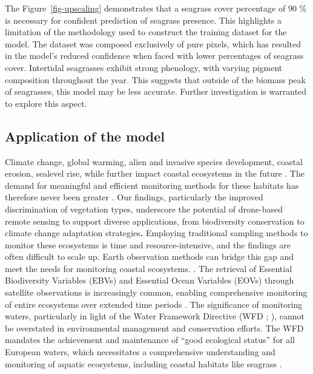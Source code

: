 \documentclass[
  number]{elsarticle}
\begin{document}
The Figure~\ref{fig-upscaling} demonstrates that a seagrass cover
percentage of 90 \% is necessary for confident prediction of seagrass
presence. This highlights a limitation of the methodology used to
construct the training dataset for the model. The dataset was composed
exclusively of pure pixels, which has resulted in the model's reduced
confidence when faced with lower percentages of seagrass cover.
Intertidal seagrasses exhibit strong phenology, with varying pigment
composition throughout the year\citetext{\citealp[
]{bargain2013seasonal}; \citealp{legare2022remote}}. This suggests that
outside of the biomass peak of seagrasses, this model may be less
accurate. Further investigation is warranted to explore this aspect.

\subsection{Application of the model}\label{application-of-the-model}

Climate change, global warming, alien and invasive species development,
coastal erosion, sealevel rise, while further impact coastal ecosystems
in the future \citetext{\citealp{SCHIBALSKI2022101414}; \citealp[
]{holon2018predictive}; \citealp{marquet2024global}}. The demand for
meaningful and efficient monitoring methods for these habitats has
therefore never been greater \citetext{\citealp[
]{muller2018satellite}; \citealp[
]{villalobos2023remote}; \citealp{oiry2021using}}. Our findings,
particularly the improved discrimination of vegetation types, underscore
the potential of drone-based remote sensing to support diverse
applications, from biodiversity conservation to climate change
adaptation strategies\textbf{.} Employing traditional sampling methods
to monitor these ecosystems is time and resource-intensive, and the
findings are often difficult to scale up. Earth observation methods can
bridge this gap and meet the needs for monitoring coastal ecosystems.
\citep{papathanasopoulou2019satellite}. The retrieval of Essential
Biodiversity Variables (EBVs) and Essential Ocean Variables (EOVs)
through satellite observations is increasingly common, enabling
comprehensive monitoring of entire ecosystems over extended time periods
\citetext{\citealp[
]{ratnarajah2023monitoring}; \citealp{ZOFFOLI2020112020}}. The
significance of monitoring waters, particularly in light of the Water
Framework Directive (WFD ; \citep{WFD2000}), cannot be overstated in
environmental management and conservation efforts. The WFD mandates the
achievement and maintenance of ``good ecological status'' for all
European waters, which necessitates a comprehensive understanding and
monitoring of aquatic ecosystems, including coastal habitats like
seagrass \citetext{\citealp[ ]{foden2007angiosperms}; \citealp[
]{nordlund2024one}; \citealp{Zoffoli2021}}.
\end{document}

